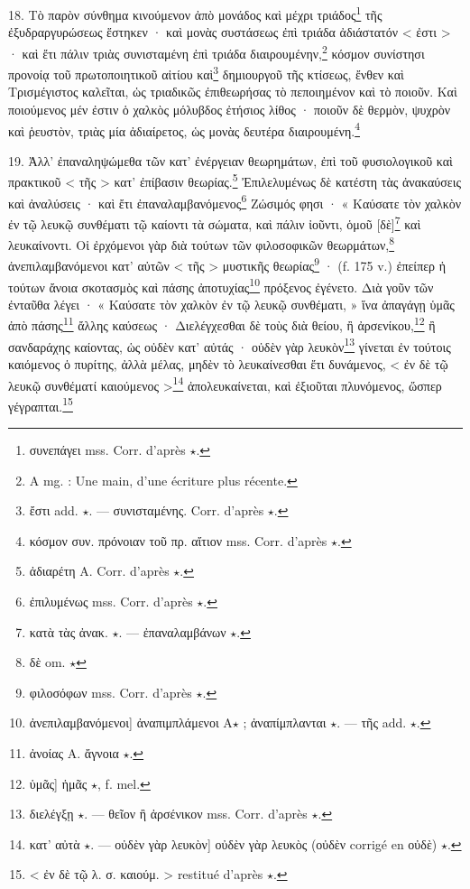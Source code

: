 \documentclass[landscape, a4paper, 11pt, oneside, polutonikogreek, french]{article}
\begin{document}
18. Τὸ παρὸν σύνθημα κινούμενον ἀπὸ μονάδος καὶ μέχρι τριάδος\footnote{συνεπάγει mss. Corr. d'après $\star$.} τῆς ἐξυδραργυρώσεως ἕστηκεν · καὶ μονὰς συστάσεως ἐπὶ τριάδα ἀδιάστατόν < ἐστι > · καὶ ἔτι πάλιν τριὰς συνισταμένη ἐπὶ τριάδα διαιρουμένην,\footnote{A mg. : Une main, d'une écriture plus récente.} κόσμον συνίστησι προνοίᾳ τοῦ πρωτοποιητικοῦ αἰτίου καὶ\footnote{ἔστι add. $\star$. --- συνισταμένης. Corr. d'après $\star$.} δημιουργοῦ τῆς κτίσεως, ἔνθεν καὶ Τρισμέγιστος καλεῖται, ὡς τριαδικῶς ἐπιθεωρήσας τὸ πεποιημένον καὶ τὸ ποιοῦν. Καὶ ποιούμενος μέν ἐστιν ὁ χαλκὸς μόλυβδος ἐτήσιος λίθος · ποιοῦν δὲ θερμὸν, ψυχρὸν καὶ ῥευστὸν, τριὰς μία ἀδιαίρετος, ὡς μονὰς δευτέρα διαιρουμένη.\footnote{κόσμον συν. πρόνοιαν τοῦ πρ. αἴτιον mss. Corr. d'après $\star$.}

19. Ἀλλ' ἐπαναληψώμεθα τῶν κατ' ἐνέργειαν θεωρημάτων, ἐπὶ τοῦ φυσιολογικοῦ καὶ πρακτικοῦ < τῆς > κατ' ἐπίβασιν θεωρίας.\footnote{ἀδιαρέτη A. Corr. d'après $\star$.} Ἐπιλελυμένως δὲ κατέστη τὰς ἀνακαύσεις καὶ ἀναλύσεις · καὶ ἔτι ἐπαναλαμβανόμενος\footnote{ἐπιλυμένως mss. Corr. d'après $\star$.} Ζώσιμός φησι · « Καύσατε τὸν χαλκὸν ἐν τῷ λευκῷ συνθέματι τῷ καίοντι τὰ σώματα, καὶ πάλιν ἰοῦντι, ὁμοῦ [δὲ]\footnote{κατὰ τὰς ἀνακ. $\star$. --- ἐπαναλαμβάνων $\star$.} καὶ λευκαίνοντι. Οἱ ἐρχόμενοι γὰρ διὰ τούτων τῶν φιλοσοφικῶν θεωρμάτων,\footnote{δὲ om. $\star$} ἀνεπιλαμβανόμενοι κατ' αὐτῶν < τῆς > μυστικῆς θεωρίας\footnote{φιλοσόφων mss. Corr. d'après $\star$.} · (f. 175 v.) ἐπείπερ ἡ τούτων ἄνοια σκοτασμὸς καὶ πάσης ἀποτυχίας\footnote{ἀνεπιλαμβανόμενοι] ἀναπιμπλάμενοι A$\star$ ; ἀναπίμπλανται $\star$. --- τῆς add. $\star$.} πρόξενος ἐγένετο. Διὰ γοῦν τῶν ἐνταῦθα λέγει · « Καύσατε τὸν χαλκὸν ἐν τῷ λευκῷ συνθέματι, » ἵνα ἀπαγάγῃ ὑμᾶς ἀπὸ πάσης\footnote{ἀνοίας A. ἄγνοια $\star$.} ἄλλης καύσεως · Διελέγχεσθαι δὲ τοὺς διὰ θείου, ἢ ἀρσενίκου,\footnote{ὑμᾶς] ἡμᾶς $\star$, f. mel.} ἢ σανδαράχης καίοντας, ὡς οὐδὲν κατ' αὐτάς · οὐδὲν γὰρ λευκὸν\footnote{διελέγξῃ $\star$. --- θεῖον ἢ ἀρσένικον mss. Corr. d'après $\star$.} γίνεται ἐν τούτοις καιόμενος ὁ πυρίτης, ἀλλὰ μέλας, μηδὲν τὸ λευκαίνεσθαι ἔτι δυνάμενος, < ἐν δὲ τῷ λευκῷ συνθέματί καιούμενος >\footnote{κατ' αὐτὰ $\star$. --- οὐδὲν γὰρ λευκὸν] οὐδὲν γὰρ λευκὸς (οὐδὲν corrigé en οὐδὲ) $\star$.} ἀπολευκαίνεται, καὶ ἐξιοῦται πλυνόμενος, ὥσπερ γέγραπται.\footnote{< ἐν δὲ τῷ λ. σ. καιούμ. > restitué d'après $\star$.}
\end{document}
